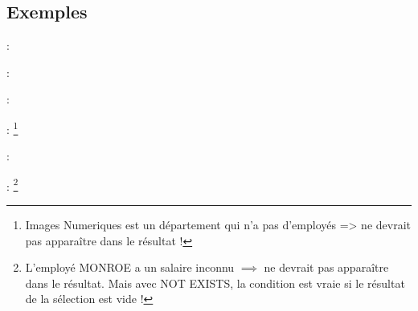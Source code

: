 \documentclass[10pt]{beamer}
\begin{document}
\subsection{Exemples}
\begin{frame}{\secname : \subsecname}
    
\end{frame}

\begin{frame}{\secname : \subsecname}
    
\end{frame}

\begin{frame}{\secname : \subsecname}
    
\end{frame}

\begin{frame}{\secname : \subsecname}
    \footnote{Images Numeriques est un département qui n'a pas d'employés => ne devrait pas apparaître dans le résultat !}
\end{frame}

\begin{frame}{\secname : \subsecname}
    
\end{frame}

\begin{frame}{\secname : \subsecname}
    \footnote{L'employé MONROE a un salaire inconnu $\implies$ ne devrait pas apparaître dans le résultat. Mais avec NOT EXISTS, la condition est vraie si le résultat de la sélection est vide !}
\end{frame}
\end{document}
